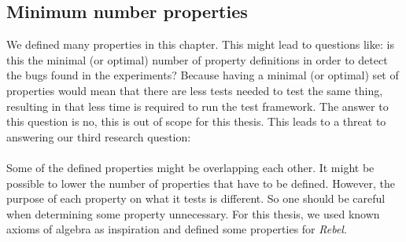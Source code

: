 \subsection*{Minimum number properties}
We defined many properties in this chapter. This might lead to questions like:
is this the minimal (or optimal) number of property definitions in order to
detect the bugs found in the experiments? Because having a minimal (or optimal) set of properties would mean that there are less tests needed to test the same thing, resulting in that less time is required to run the test framework. The answer to this question is no, this is out of scope
for this thesis. This leads to a threat to answering our third research
question:\rqThree\\
\\
Some of the defined properties might be overlapping each other. It might be possible to
lower the number of properties that have to be defined. However, the purpose of
each property on what it tests is different. So one should be careful when
determining some property unnecessary. For this thesis, we used known
axioms of algebra as inspiration and defined some properties for \textit{Rebel}.

